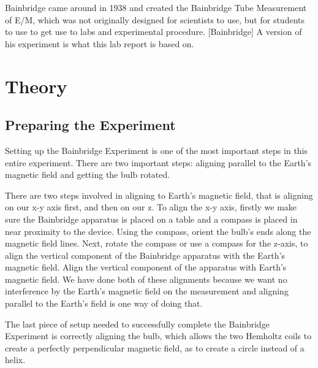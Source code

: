 \documentclass[aps,prl,10pt,twocolumn,floatfix]{revtex4-2}
\begin{document}
Bainbridge came around in 1938 and created the Bainbridge Tube Measurement of E/M, which was not originally designed for scientists to use, but for students to use to get use to labs and experimental procedure. [Bainbridge]
A version of his experiment is what this lab report is based on. 


\section{Theory}\label{Theory}

\subsection{Preparing the Experiment}
Setting up the Bainbridge Experiment is one of the most important steps in this entire experiment. 
There are two important steps: aligning parallel to the Earth's magnetic field and getting the bulb rotated.

There are two steps involved in aligning to Earth's magnetic field, that is aligning on our x-y axis first, and then on our z.
To align the x-y axis, firstly we make sure the Bainbridge apparatus is placed on a table and a compass is placed in near proximity to the device. 
Using the compass, orient the bulb's ends along the magnetic field lines.
Next, rotate the compass or use a compass for the z-axis, to align the vertical component of the Bainbridge apparatus with the Earth's magnetic field. 
Align the vertical component of the apparatus with Earth's magnetic field. 
We have done both of these alignments because we want no interference by the Earth's magnetic field on the measurement and aligning parallel to the Earth's field is one way of doing that.  

The last piece of setup needed to successfully complete the Bainbridge Experiment is correctly aligning the bulb, which allows the two Hemholtz coils to create a perfectly perpendicular magnetic field, as to create a circle instead of a helix. 
\end{document}
